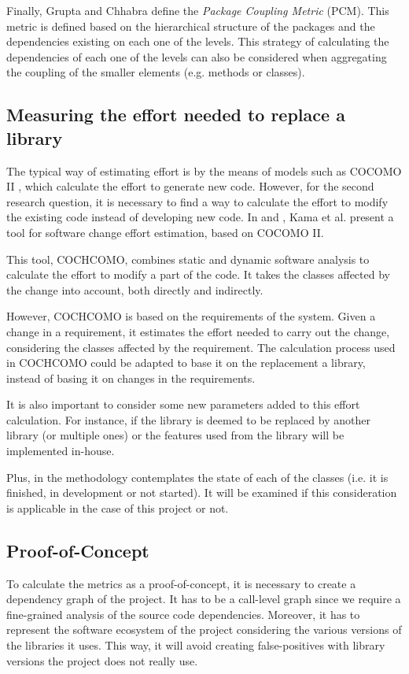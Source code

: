 Finally, Grupta and Chhabra \cite{gupta2009package} define the \textit{Package Coupling Metric} (PCM). This metric is defined based on the hierarchical structure of the packages and the dependencies existing on each one of the levels. This strategy of calculating the dependencies of each one of the levels can also be considered when aggregating the coupling of the smaller elements (e.g. methods or classes).

\subsection{Measuring the effort needed to replace a library}
The typical way of estimating effort is by the means of models such as COCOMO II \cite{sharma2011analysis}, which calculate the effort to generate new code. However, for the second research question, it is necessary to find a way to calculate the effort to modify the existing code instead of developing new code. In \cite{kama2014cochcomo} and \cite{asl2013change}, Kama et al. present a tool for software change effort estimation, based on COCOMO II.

This tool, COCHCOMO, combines static and dynamic software analysis to calculate the effort to modify a part of the code. It takes the classes affected by the change into account, both directly and indirectly.

However, COCHCOMO is based on the requirements of the system. Given a change in a requirement, it estimates the effort needed to carry out the change, considering the classes affected by the requirement. The calculation process used in COCHCOMO could be adapted to base it on the replacement a library, instead of basing it on changes in the requirements.

It is also important to consider some new parameters added to this effort calculation. For instance, if the library is deemed to be replaced by another library (or multiple ones) or the features used from the library will be implemented in-house.

Plus, in \cite{kama2014cochcomo} the methodology contemplates the state of each of the classes (i.e. it is finished, in development or not started). It will be examined if this consideration is applicable in the case of this project or not.

\subsection{Proof-of-Concept}
To calculate the metrics as a proof-of-concept, it is necessary to create a dependency graph of the project. It has to be a call-level graph since we require a fine-grained analysis of the source code dependencies. Moreover, it has to represent the software ecosystem of the project considering the various versions of the libraries it uses. This way, it will avoid creating false-positives with library versions the project does not really use.

